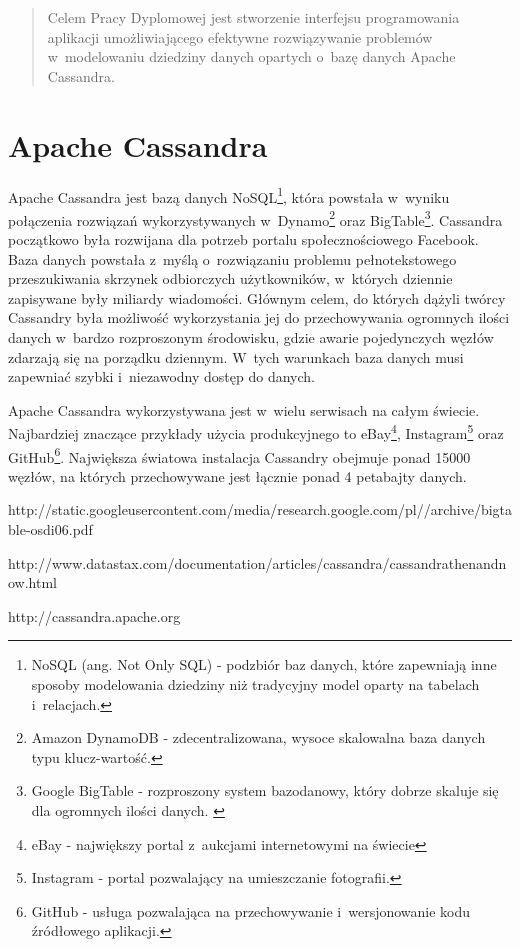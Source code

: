\documentclass{report}
\begin{document}
\begin{abstract}
	Celem Pracy Dyplomowej jest stworzenie interfejsu programowania aplikacji umożliwiającego efektywne rozwiązywanie problemów w~modelowaniu dziedziny danych opartych o~bazę danych Apache Cassandra.
\end{abstract}

\chapter{Apache Cassandra}

Apache Cassandra jest bazą danych NoSQL\footnote{NoSQL (ang. Not Only SQL) - podzbiór baz danych, które zapewniają inne sposoby modelowania dziedziny niż tradycyjny model oparty na tabelach i~relacjach.}, która powstała w~wyniku połączenia rozwiązań wykorzystywanych w~Dynamo\footnote{Amazon DynamoDB - zdecentralizowana, wysoce skalowalna baza danych typu klucz-wartość.} oraz BigTable\footnote{Google BigTable - rozproszony system bazodanowy, który dobrze skaluje się dla ogromnych ilości danych. \cite{official_bigtable}}. Cassandra początkowo była rozwijana dla potrzeb portalu społecznościowego Facebook. Baza danych powstała z~myślą o~rozwiązaniu problemu pełnotekstowego przeszukiwania skrzynek odbiorczych użytkowników, w~których dziennie zapisywane były miliardy wiadomości. Głównym celem, do których dążyli twórcy Cassandry była możliwość wykorzystania jej do przechowywania ogromnych ilości danych w~bardzo rozproszonym środowisku, gdzie awarie pojedynczych węzłów zdarzają się na porządku dziennym. W~tych warunkach baza danych musi zapewniać szybki i~niezawodny dostęp do danych. \cite{cassandra_introduction} 

Apache Cassandra wykorzystywana jest w~wielu serwisach na całym świecie. Najbardziej znaczące przykłady użycia produkcyjnego to eBay\footnote{eBay - największy portal z~aukcjami internetowymi na świecie}, Instagram\footnote{Instagram - portal pozwalający na umieszczanie fotografii.} oraz GitHub\footnote{GitHub - usługa pozwalająca na przechowywanie i~wersjonowanie kodu źródłowego aplikacji.}. Największa światowa instalacja Cassandry obejmuje ponad 15000 węzłów, na których przechowywane jest łącznie ponad 4 petabajty danych.


\begin{thebibliography}{9}

http://static.googleusercontent.com/media/research.google.com/pl//archive/bigtable-osdi06.pdf

http://www.datastax.com/documentation/articles/cassandra/cassandrathenandnow.html


http://cassandra.apache.org

\end{thebibliography}
\end{document}
